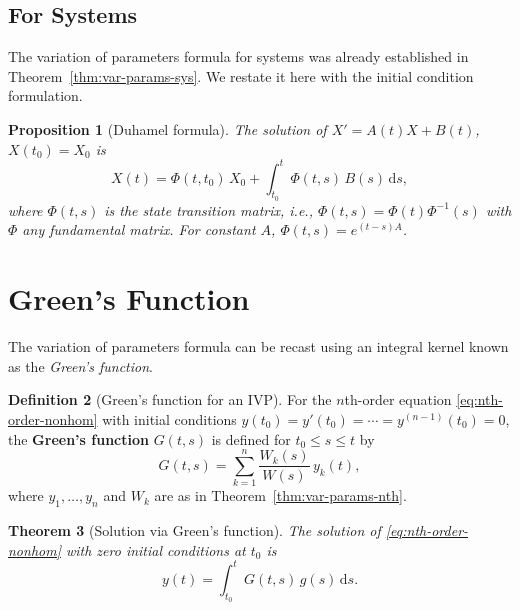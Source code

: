 \documentclass[12pt,a4paper,openany]{book}
\theoremstyle{definition}
\newtheorem{definition}{Definition}[chapter]
\theoremstyle{plain}
\newtheorem{theorem}[definition]{Theorem}
\newtheorem{proposition}[definition]{Proposition}
\theoremstyle{remark}
\newcommand{\dd}{\mathrm{d}}
\begin{document}
\subsection{For Systems}\label{subsec:var-params-systems}

The variation of parameters formula for systems was already established in
Theorem~\ref{thm:var-params-sys}.  We restate it here with the initial
condition formulation.

\begin{proposition}[Duhamel formula]\label{prop:duhamel}
The solution of $X'=A(t)X+B(t)$, $X(t_0)=X_0$ is
\begin{equation}\label{eq:duhamel}
  X(t) = \Phi(t,t_0)\,X_0 + \int_{t_0}^{t}\Phi(t,s)\,B(s)\,\dd s,
\end{equation}
where $\Phi(t,s)$ is the state transition matrix,
i.e., $\Phi(t,s) = \Phi(t)\Phi^{-1}(s)$ with $\Phi$ any fundamental matrix.
For constant $A$, $\Phi(t,s)=e^{(t-s)A}$.
\end{proposition}

\section{Green's Function}\label{sec:green}

The variation of parameters formula can be recast using an integral kernel
known as the \emph{Green's function}.

\begin{definition}[Green's function for an IVP]\label{def:green-ivp}
For the $n$th-order equation \eqref{eq:nth-order-nonhom} with initial
conditions $y(t_0)=y'(t_0)=\cdots=y^{(n-1)}(t_0)=0$, the
\textbf{Green's function} $G(t,s)$ is defined for $t_0\le s\le t$ by
\begin{equation}\label{eq:green-ivp}
  G(t,s) = \sum_{k=1}^{n}\frac{W_k(s)}{W(s)}\,y_k(t),
\end{equation}
where $y_1,\dots,y_n$ and $W_k$ are as in Theorem~\ref{thm:var-params-nth}.
\end{definition}

\begin{theorem}[Solution via Green's function]\label{thm:green-solution}
The solution of \eqref{eq:nth-order-nonhom} with zero initial conditions
at $t_0$ is
\begin{equation}\label{eq:green-sol}
  y(t) = \int_{t_0}^{t}G(t,s)\,g(s)\,\dd s.
\end{equation}
\end{theorem}
\end{document}
